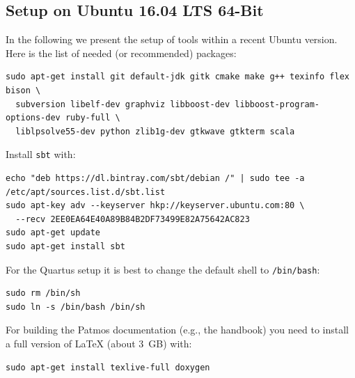 \documentclass[a4paper,fontsize=10pt,twoside,DIV15,BCOR12mm,headinclude=true,footinclude=false,pagesize,bibtotoc]{scrbook}
\newcommand{\code}[1]{{\texttt{#1}}}
\begin{document}
\subsection{Setup on Ubuntu 16.04 LTS 64-Bit}

In the following we present the setup of tools within a recent Ubuntu version.
Here is the list of needed (or recommended) packages:

\begin{verbatim}
sudo apt-get install git default-jdk gitk cmake make g++ texinfo flex bison \
  subversion libelf-dev graphviz libboost-dev libboost-program-options-dev ruby-full \
  liblpsolve55-dev python zlib1g-dev gtkwave gtkterm scala
\end{verbatim}

Install \code{sbt} with:

\begin{verbatim}
echo "deb https://dl.bintray.com/sbt/debian /" | sudo tee -a /etc/apt/sources.list.d/sbt.list
sudo apt-key adv --keyserver hkp://keyserver.ubuntu.com:80 \
  --recv 2EE0EA64E40A89B84B2DF73499E82A75642AC823
sudo apt-get update
sudo apt-get install sbt
\end{verbatim}

For the Quartus setup it is best to change the default shell to \code{/bin/bash}:

\begin{verbatim}
sudo rm /bin/sh
sudo ln -s /bin/bash /bin/sh
\end{verbatim}


For building the Patmos documentation (e.g., the handbook) you need to install
a full version of LaTeX (about 3~GB) with:

\begin{verbatim}
sudo apt-get install texlive-full doxygen
\end{verbatim}
\end{document}

